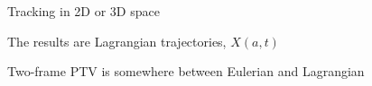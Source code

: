 \begin{frame}[label=ptv-12]{Tracking in 2D or 3D space}
\begin{multicols*}{2}



\end{multicols*}
\end{frame}





			

\begin{frame}[label=ptv-15]{The results are Lagrangian trajectories, $X(a,t)$}
    \centering
\end{frame}


\begin{frame}[label=ptv-16]{Two-frame PTV is somewhere between Eulerian and Lagrangian}
    \centering{}
\end{frame}



